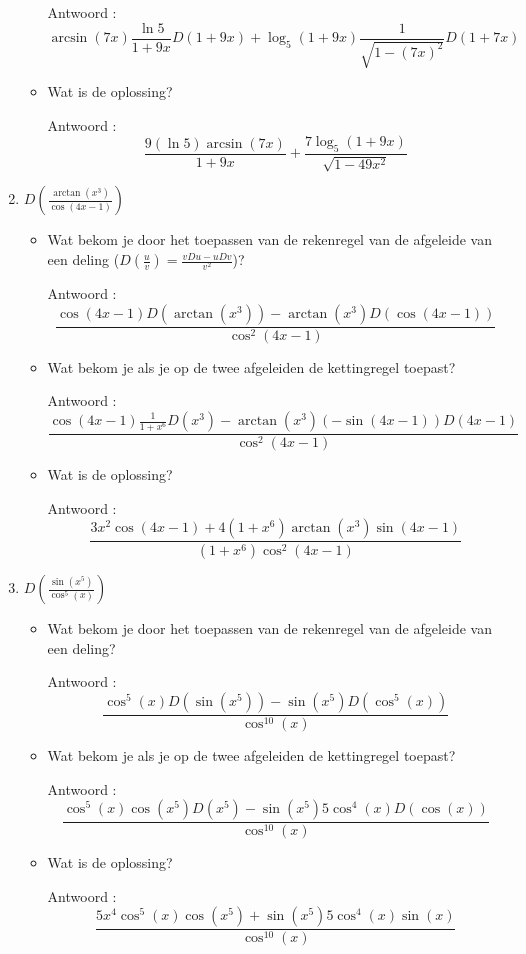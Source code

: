 \begin{enumerate}
\begin{itemize}
		Antwoord :  \[\arcsin (7x)\frac{\ln 5}{1+9x}D(1+9x)+\log_5(1+9x)\frac{1}{\sqrt{1-(7x)^2}}D(1+7x)\]
		
		\item Wat is de oplossing?
		
		Antwoord : \[\frac{9 \left( \ln 5  \right)\arcsin (7x)}{1+9x}+\frac{7\log_5(1+9x)}{\sqrt{1-49x^2}}\]
		
	\end{itemize}
	
	\item $D \left( \frac{\arctan \left( x^3  \right)}{\cos (4x-1)}  \right)$
	
	\begin{itemize}
		
		\item Wat bekom je door het toepassen van de rekenregel van de afgeleide van een deling ($D \left(  \frac{u}{v} \right)=\frac {vDu-uDv}{v^2}$)?
		
		Antwoord : \[\frac {\cos (4x-1) D \left(  \arctan \left( x^3 \right)  \right)-\arctan \left( x^3 \right)D\left( \cos (4x-1)  \right)}{\cos ^2(4x-1)}\]
		
		\item Wat bekom je als je op de twee afgeleiden de kettingregel toepast?
		
		Antwoord : \[\frac {\cos (4x-1) \frac{1}{1+x^6}D\left( x^3 \right)-\arctan \left( x^3 \right)\left(- \sin (4x-1)  \right)D(4x-1)}{\cos ^2(4x-1)}\]
		
		\item Wat is de oplossing?
		
		Antwoord : \[\frac {3x^2\cos (4x-1) +4(1+x^6)\arctan \left( x^3 \right) \sin (4x-1)}{(1+x^6)\cos ^2(4x-1)}\]
		
	\end{itemize}
	
	\item $D \left(  \frac{\sin \left( x^5  \right)}{\cos ^5 (x)}  \right)$
	
	\begin{itemize}
		
		\item Wat bekom je door het toepassen van de rekenregel van de afgeleide van een deling?
		
		Antwoord : \[\frac {\cos ^5(x)D\left( \sin \left(  x^5  \right)  \right)-\sin \left(  x^5 \right)D\left( \cos^5(x)  \right)}{\cos ^{10}(x)}\]
		
		\item Wat bekom je als je op de twee afgeleiden de kettingregel toepast?
		
		Antwoord : \[\frac {\cos ^5(x) \cos \left(  x^5  \right) D\left( x^5 \right)-\sin \left(  x^5 \right)5 \cos^4(x) D(\cos (x))}{\cos ^{10}(x)}\]
		
		\item Wat is de oplossing?
		
		Antwoord : \[\frac {5x^4\cos ^5(x) \cos \left(  x^5  \right)+\sin \left(  x^5 \right)5 \cos^4(x) \sin (x)}{\cos ^{10}(x)}\]
		
	\end{itemize}
	
	
\end{enumerate}


